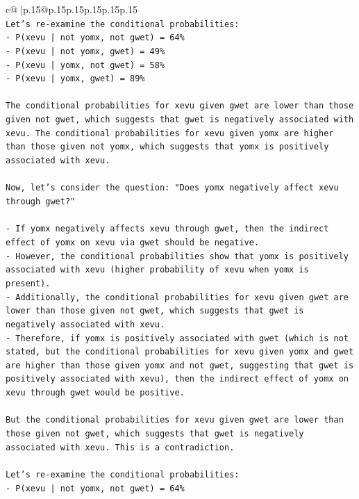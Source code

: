 \documentclass{article}
\begin{document}
{\begin{supertabular}{c@{$\;$}|p{.15\linewidth}@{}p{.15\linewidth}p{.15\linewidth}p{.15\linewidth}p{.15\linewidth}p{.15\linewidth}}
{{{\\ 
\texttt{Let's re{-}examine the conditional probabilities:} \\
\texttt{{-}   P(xevu | not yomx, not gwet) = 64\%} \\
\texttt{{-}   P(xevu | not yomx, gwet) = 49\%} \\
\texttt{{-}   P(xevu | yomx, not gwet) = 58\%} \\
\texttt{{-}   P(xevu | yomx, gwet) = 89\%} \\
\\ 
\texttt{The conditional probabilities for xevu given gwet are lower than those given not gwet, which suggests that gwet is negatively associated with xevu. The conditional probabilities for xevu given yomx are higher than those given not yomx, which suggests that yomx is positively associated with xevu.} \\
\\ 
\texttt{Now, let's consider the question: "Does yomx negatively affect xevu through gwet?"} \\
\\ 
\texttt{{-}   If yomx negatively affects xevu through gwet, then the indirect effect of yomx on xevu via gwet should be negative.} \\
\texttt{{-}   However, the conditional probabilities show that yomx is positively associated with xevu (higher probability of xevu when yomx is present).} \\
\texttt{{-}   Additionally, the conditional probabilities for xevu given gwet are lower than those given not gwet, which suggests that gwet is negatively associated with xevu.} \\
\texttt{{-}   Therefore, if yomx is positively associated with gwet (which is not stated, but the conditional probabilities for xevu given yomx and gwet are higher than those given yomx and not gwet, suggesting that gwet is positively associated with xevu), then the indirect effect of yomx on xevu through gwet would be positive.} \\
\\ 
\texttt{But the conditional probabilities for xevu given gwet are lower than those given not gwet, which suggests that gwet is negatively associated with xevu. This is a contradiction.} \\
\\ 
\texttt{Let's re{-}examine the conditional probabilities:} \\
\texttt{{-}   P(xevu | not yomx, not gwet) = 64\%} \\
}}}
\end{supertabular}}
\end{document}

